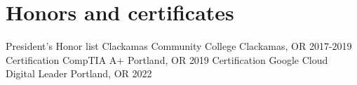 \section{Honors and certificates}
\begin{cvhonors}

\cvhonor
{President's Honor list} %
{Clackamas Community College} %
{Clackamas, OR} %
{2017-2019} %
\cvhonor
{Certification} %
{CompTIA A+} %
{Portland, OR} %
{2019} %
\cvhonor
{Certification} %
{Google Cloud Digital Leader} %
{Portland, OR} %
{2022} %

\end{cvhonors}